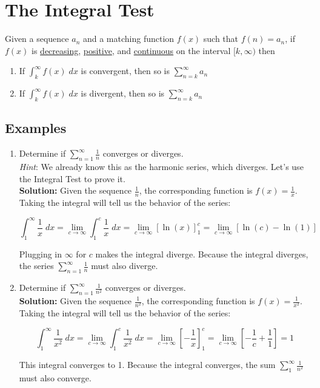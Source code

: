 \documentclass[12pt]{report}
\begin{document}
\clearpage





\section{The Integral Test}
Given a sequence $ a_n $ and a matching function $ f(x) $ such that $ f(n) = a_n $, if $ f(x) $ is \underline{decreasing}, \underline{positive}, and \underline{continuous} on the interval $ [k,\infty) $ then

\begin{enumerate}
	\item If $ \int_k^\infty f(x)\;dx $ is convergent, then so is $ \sum_{n=k}^{\infty} a_n $
	\item If $ \int_k^\infty f(x)\;dx $ is divergent, then so is $ \sum_{n=k}^{\infty} a_n $
\end{enumerate}


\subsection*{Examples}
\begin{enumerate}

	\item Determine if $ \sum_{n=1}^{\infty} \frac{1}{n} $ converges or diverges. \\
	
	\textit{Hint}: We already know this as the harmonic series, which diverges. Let's use the Integral Test to prove it. \\
	
	\textbf{Solution:} Given the sequence $ \frac{1}{n} $, the corresponding function is $ f(x) = \frac{1}{x} $. Taking the integral will tell us the behavior of the series:
	
	$$
		\int_{1}^{\infty} \frac{1}{x}\;dx =
		\lim_{c\to\infty} \int_{1}^{c} \frac{1}{x}\;dx =
		\lim_{c\to\infty} \left[\ln(x)\right]_{1}^{c} =
		\lim_{c\to\infty} \left[\ln(c) - \ln(1)\right]				
	$$
	
	Plugging in $ \infty $ for $ c $ makes the integral diverge. Because the integral diverges, the series $ \sum_{n=1}^{\infty} \frac{1}{n} $ must also diverge.
	
	\item Determine if $ \sum_{n=1}^{\infty} \frac{1}{n^2} $ converges or diverges. \\
	
	
	\textbf{Solution:} Given the sequence $ \frac{1}{n^2} $, the corresponding function is $ f(x) = \frac{1}{x^2} $. Taking the integral will tell us the behavior of the series:
	
	$$
		\int_{1}^{\infty} \frac{1}{x^2}\;dx =
		\lim_{c\to\infty} \int_{1}^{c} \frac{1}{x^2}\;dx =
		\lim_{c\to\infty} \left[ -\frac{1}{x} \right]_{1}^{c} =
		\lim_{c\to\infty} \left[ -\frac{1}{c} + \frac{1}{1} \right] = 1
	$$
	
	This integral converges to 1. Because the integral converges, the sum $ \sum_{1}^{\infty} \frac{1}{n^2} $ must also converge.



\end{enumerate}
\end{document}
